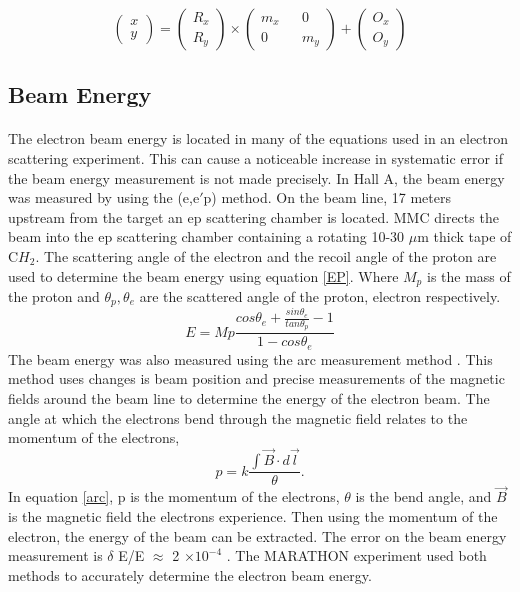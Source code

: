 	 
	 \begin{equation}
	 	\begin{pmatrix}
		 	x\\
	 		y
	 	\end{pmatrix}
	 	=
	 	\begin{pmatrix}
	 		R_x\\
		 	R_y
	 	\end{pmatrix}
	 	\times
	 	\begin{pmatrix}
			m_x && 0 \\
			0  && m_y
	 	\end{pmatrix}
	 	+
	 	\begin{pmatrix}
		 	O_x\\
	 		O_y
	 	\end{pmatrix}
	 	\label{eq:raster}
	 \end{equation}

 
	 \subsection{Beam Energy}
	 \paragraph{}The electron beam energy is located in many of the equations used in an electron scattering experiment. This can cause a noticeable increase in systematic error if the beam energy measurement is not made precisely. In Hall A, the beam energy was measured by using the (e,e$\prime$p) method. On the beam line, 17 meters upstream from the target an ep scattering chamber is located. MMC directs the beam into the ep scattering chamber containing a rotating 10-30 $\mu$m thick tape of C$H_2$. The scattering angle of the electron and the recoil angle of the proton are used to determine the beam energy using equation \ref{EP}. Where $M_p$ is the mass of the proton and $\theta_p, \theta_e$ are the scattered angle of the proton, electron respectively. 
	\begin{equation}
	\label{EP}
	E = Mp \frac{cos\theta_e + \frac{sin\theta_e}{tan\theta_p}-1}{1 - cos\theta_e} 
	\end{equation}
	The beam energy was also measured using the arc measurement method \cite{Flay}. This method uses changes is beam position and precise measurements of the magnetic fields around the beam line to determine the energy of the electron beam. The angle at which the electrons bend through the magnetic field relates to the momentum of the electrons,
	\begin{equation}
	\label{arc}
	p = k \frac{\int \vec{B} \cdot d\vec{l}}{\theta}.
	\end{equation}	
	In equation \ref{arc}, p is the momentum of the electrons, $\theta$ is the bend angle, and $\vec{B}$ is the magnetic field the electrons experience. Then using the momentum of the electron, the energy of the beam can be extracted. The error on the beam energy measurement is $\delta$ E/E $\approx$ 2 $\times 10^{-4} $ \cite{EPMet, Flay}.  The MARATHON experiment used both methods to accurately determine the electron beam energy.
	
